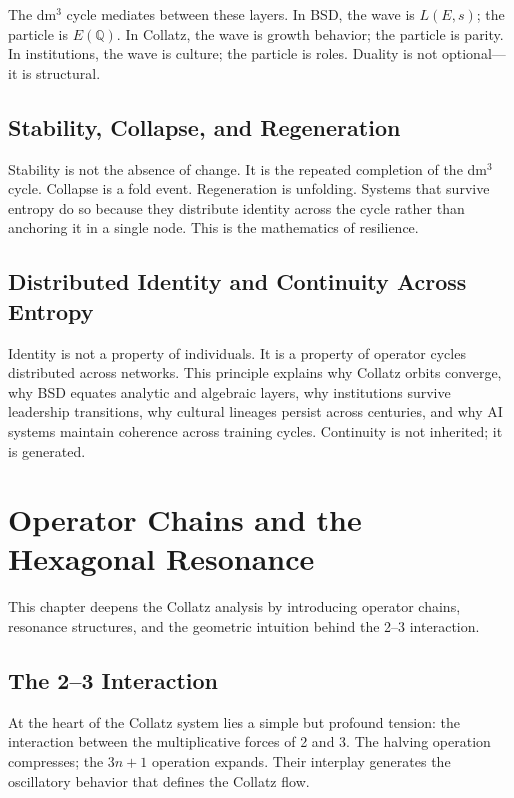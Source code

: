 \documentclass[14pt, twoside, openright]{book}
\theoremstyle{definition}
\theoremstyle{remark}
\begin{document}
The dm$^{3}$ cycle mediates between these layers. In BSD, the wave is $L(E,s)$;
the particle is $E(\mathbb{Q})$. In Collatz, the wave is growth behavior; the
particle is parity. In institutions, the wave is culture; the particle is roles.
Duality is not optional---it is structural.

\section{Stability, Collapse, and Regeneration}

Stability is not the absence of change. It is the repeated completion of the
dm$^{3}$ cycle. Collapse is a fold event. Regeneration is unfolding. Systems
that survive entropy do so because they distribute identity across the cycle
rather than anchoring it in a single node. This is the mathematics of resilience.

\section{Distributed Identity and Continuity Across Entropy}

Identity is not a property of individuals. It is a property of operator cycles
distributed across networks. This principle explains why Collatz orbits converge,
why BSD equates analytic and algebraic layers, why institutions survive leadership
transitions, why cultural lineages persist across centuries, and why AI systems
maintain coherence across training cycles. Continuity is not inherited; it is
generated.

\chapter{Operator Chains and the Hexagonal Resonance}

This chapter deepens the Collatz analysis by introducing operator chains,
resonance structures, and the geometric intuition behind the 2--3 interaction.

\section{The 2--3 Interaction}

At the heart of the Collatz system lies a simple but profound tension: the
interaction between the multiplicative forces of 2 and 3. The halving operation
compresses; the $3n+1$ operation expands. Their interplay generates the
oscillatory behavior that defines the Collatz flow.
\end{document}
